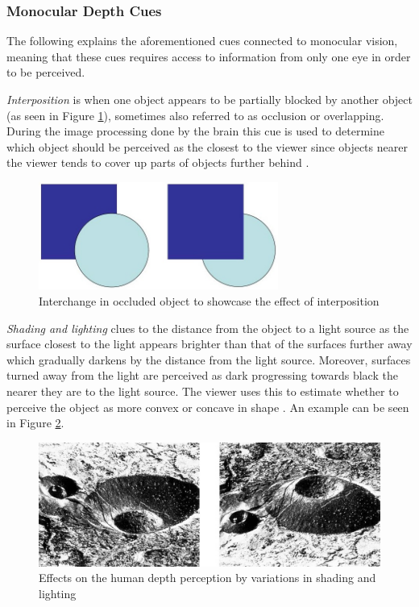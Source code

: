 \subsubsection{Monocular Depth Cues}
The following explains the aforementioned cues connected to monocular vision, meaning that these cues requires access to information from only one eye in order to be perceived.

\textit{Interposition} is when one object appears to be partially blocked by another object (as seen in Figure \ref{fig:cue0}), sometimes also referred to as occlusion or overlapping. During the image processing done by the brain this cue is used to determine which object should be perceived as the closest to the viewer since objects nearer the viewer tends to cover up parts of objects further behind \cite{Gale}.

\begin{figure}[h!]
   \centering
   \includegraphics[width=0.7\textwidth]{figures/cue0.jpg}
   \caption{Interchange in occluded object to showcase the effect of interposition \cite{Heeger}}\label{fig:cue0}
\end{figure}

\textit{Shading and lighting} clues to the distance from the object to a light source as the surface closest to the light appears brighter than that of the surfaces further away which gradually darkens by the distance from the light source. Moreover, surfaces turned away from the light are perceived as dark progressing towards black the nearer they are to the light source. The viewer uses this to estimate whether to perceive the object as more convex or concave in shape \cite{The Gale Encyclopedia of Science}.  An example can be seen in Figure \ref{fig:cue1}.

\begin{figure}[h!]
   \centering
   \includegraphics[width=\textwidth]{figures/cue1.jpg}
   \caption{Effects on the human depth perception by variations in shading and lighting \cite{Heeger}}\label{fig:cue1}
\end{figure}

